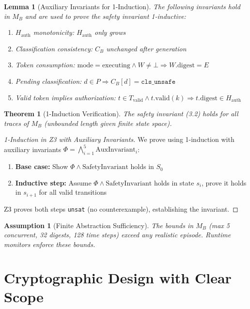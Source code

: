 \documentclass[12pt]{article}
\newtheorem{assumption}{Assumption}[section]
\newtheorem{lemma}{Lemma}[section]
\newtheorem{theorem}{Theorem}[section]
\begin{document}
\begin{lemma}[Auxiliary Invariants for 1-Induction]
The following invariants hold in $M_B$ and are used to prove the safety invariant 1-inductive:
\begin{enumerate}
    \item $H_{\text{auth}}$ monotonicity: $H_{\text{auth}}$ only grows
    \item Classification consistency: $C_B$ unchanged after generation
    \item Token consumption: $\text{mode}=\text{executing} \land W \neq \bot \Rightarrow W.\mathrm{digest} = E$
    \item Pending classification: $d \in P \Rightarrow C_B[d] = \texttt{cls\_unsafe}$
    \item Valid token implies authorization: $t \in T_{\text{valid}} \land t.\mathrm{valid}(k) \Rightarrow t.\mathrm{digest} \in H_{\text{auth}}$
\end{enumerate}
\end{lemma}

\begin{theorem}[1-Induction Verification]
The safety invariant (3.2) holds for all traces of $M_B$ (unbounded length given finite state space).
\end{theorem}

\begin{proof}[1-Induction in Z3 with Auxiliary Invariants]
We prove using 1-induction with auxiliary invariants $\Phi = \bigwedge_{i=1}^5 \text{AuxInvariant}_i$:
\begin{enumerate}
    \item \textbf{Base case:} Show $\Phi \land \text{SafetyInvariant}$ holds in $S_0$
    \item \textbf{Inductive step:} Assume $\Phi \land \text{SafetyInvariant}$ holds in state $s_i$, prove it holds in $s_{i+1}$ for all valid transitions
\end{enumerate}
Z3 proves both steps \texttt{unsat} (no counterexample), establishing the invariant.
\end{proof}

\begin{assumption}[Finite Abstraction Sufficiency]
The bounds in $M_B$ (max 5 concurrent, 32 digests, 128 time steps) exceed any realistic episode. Runtime monitors enforce these bounds.
\end{assumption}

\section{Cryptographic Design with Clear Scope}
\end{document}
